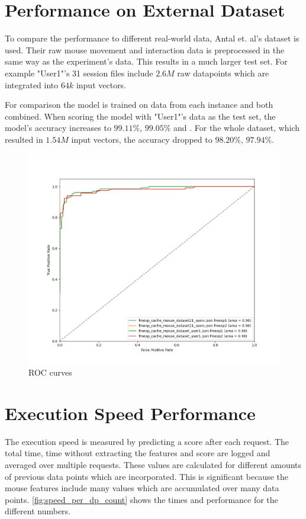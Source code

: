 \documentclass[
    fontsize=12pt,
    headings=small,
    parskip=half,           %
    bibliography=totoc,
    numbers=noenddot,       %
    open=any,               %
    final                   %
]{scrreprt}
\begin{document}
\section{Performance on External Dataset}

To compare the performance to different real-world data, Antal et. al's dataset \cite{9111596} is used. Their raw mouse movement and interaction data is preprocessed in the same way as the experiment's data. This results in a much larger test set. For example "User1"'s 31 session files include $2.6M$ raw datapoints which are integrated into $64k$ input vectors.

For comparison the model is trained on data from each instance and both combined. When scoring the model with "User1"'s data as the test set, the model's accuracy increases to $99.11\%$, $99.05\%$ and \todo. For the whole dataset, which resulted in $1.54M$ input vectors, the accuracy dropped to $98.20\%$, $97.94\%$.

\begin{figure}[h]
	\includegraphics[width=\textwidth]{figures/roc_both_datasets_both_instances.png}
	\caption{ROC curves}
	\label{fig:roc_both_datasets_both_instances}
\end{figure}


\section{Execution Speed Performance}

The execution speed is measured by predicting a score after each request. The total time, time without extracting the features and score are logged and averaged over multiple requests. These values are calculated for different amounts of previous data points which are incorporated. This is significant because the mouse features include many values which are accumulated over many data points. \ref{fig:speed_per_dp_count} shows the times and performance for the different numbers.
\end{document}
